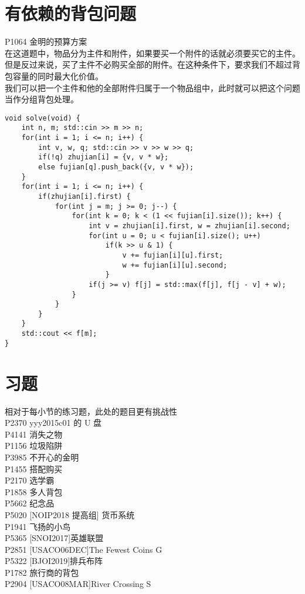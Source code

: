 \documentclass{beamer}
\begin{document}
\section{有依赖的背包问题}
\begin{frame}
P1064 金明的预算方案\\ 
在这道题中，物品分为主件和附件，如果要买一个附件的话就必须要买它的主件。但是反过来说，买了主件不必购买全部的附件。在这种条件下，要求我们不超过背包容量的同时最大化价值。\\ 
我们可以把一个主件和他的全部附件归属于一个物品组中，此时就可以把这个问题当作分组背包处理。
\end{frame}
\begin{frame}[fragile]
\begin{onlyenv}
\begin{verbatim}
void solve(void) {
    int n, m; std::cin >> m >> n;
    for(int i = 1; i <= n; i++) {
        int v, w, q; std::cin >> v >> w >> q;
        if(!q) zhujian[i] = {v, v * w};
        else fujian[q].push_back({v, v * w});
    }
    for(int i = 1; i <= n; i++) {
        if(zhujian[i].first) {
            for(int j = m; j >= 0; j--) {
                for(int k = 0; k < (1 << fujian[i].size()); k++) {
                    int v = zhujian[i].first, w = zhujian[i].second;
                    for(int u = 0; u < fujian[i].size(); u++)
                        if(k >> u & 1) {
                            v += fujian[i][u].first;
                            w += fujian[i][u].second;
                        }
                    if(j >= v) f[j] = std::max(f[j], f[j - v] + w);
                }
            }
        }
    }
    std::cout << f[m];
}
\end{verbatim}
\end{onlyenv}
\end{frame}
\section{习题}
\begin{frame}
相对于每小节的练习题，此处的题目更有挑战性\\ 
P2370 yyy2015c01 的 U 盘\\ 
P4141 消失之物\\
P1156 垃圾陷阱\\
P3985 不开心的金明\\
P1455 搭配购买\\
P2170 选学霸\\
P1858 多人背包\\
P5662 纪念品\\ 
P5020 [NOIP2018 提高组] 货币系统\\
P1941 飞扬的小鸟\\
P5365 [SNOI2017]英雄联盟 \\
P2851 [USACO06DEC]The Fewest Coins G\\
P5322 [BJOI2019]排兵布阵\\ 
P1782 旅行商的背包\\
P2904 [USACO08MAR]River Crossing S\\
\end{frame}
\end{document}
